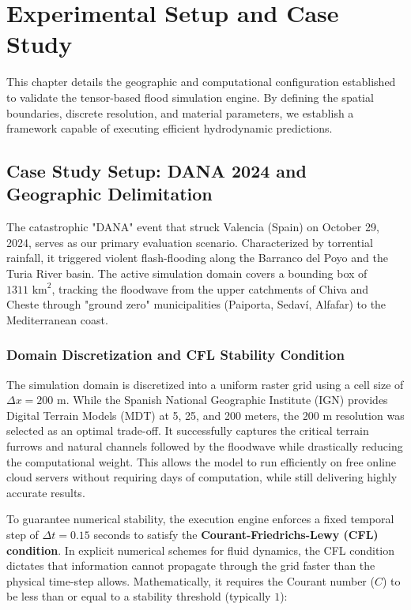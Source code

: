 \chapter{Experimental Setup and Case Study}
\label{chapter:experimental_setup_and_case_study}

This chapter details the geographic and computational configuration established to validate the tensor-based flood simulation engine. 
By defining the spatial boundaries, discrete resolution, and material parameters, we establish a framework capable of executing efficient 
hydrodynamic predictions.

\section{Case Study Setup: DANA 2024 and Geographic Delimitation}
\label{section:case_study_setup_dana_2024}

The catastrophic "DANA" event that struck Valencia (Spain) on October 29, 2024, serves as our primary evaluation scenario. Characterized by torrential rainfall, it triggered violent flash-flooding along the Barranco del Poyo and the Turia River basin. The active simulation domain covers a bounding box of $1311\text{ km}^2$, tracking the floodwave from the upper catchments of Chiva and Cheste through "ground zero" municipalities (Paiporta, Sedaví, Alfafar) to the Mediterranean coast.

\subsection{Domain Discretization and CFL Stability Condition}

The simulation domain is discretized into a uniform raster grid using a cell size of $\Delta x = 200\text{ m}$. While the Spanish National 
Geographic Institute (IGN) provides Digital Terrain Models (MDT) at 5, 25, and 200 meters, the $200\text{ m}$ resolution was selected as an 
optimal trade-off. It successfully captures the critical terrain furrows and natural channels followed by the floodwave while drastically 
reducing the computational weight. This allows the model to run efficiently on free online cloud servers without requiring days of 
computation, while still delivering highly accurate results.

To guarantee numerical stability, the execution engine enforces a fixed temporal step of $\Delta t = 0.15$ seconds to satisfy the 
\textbf{Courant-Friedrichs-Lewy (CFL) condition}. In explicit numerical schemes for fluid dynamics, the CFL condition dictates that information 
cannot propagate through the grid faster than the physical time-step allows. Mathematically, it requires the Courant number ($C$) to be 
less than or equal to a stability threshold (typically $1$):

